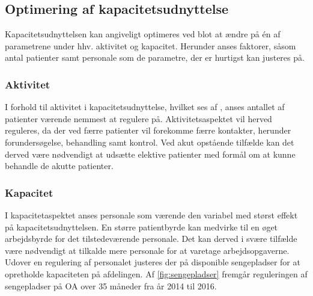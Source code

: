 \subsection{Optimering af kapacitetsudnyttelse}\label{regulerbareparametre}
Kapacitetsudnyttelsen kan angiveligt optimeres ved blot at ændre på én af parametrene under hhv. aktivitet og kapacitet. Herunder anses faktorer, såsom antal patienter samt personale som de parametre, der er hurtigst kan justeres på. 

\subsubsection{Aktivitet}
I forhold til aktivitet i kapacitetsudnyttelse, hvilket ses af , anses antallet af patienter værende nemmest at regulere på. Aktivitetsaspektet vil herved reguleres, da der ved færre patienter vil forekomme færre kontakter, herunder forundersøgelse, behandling
samt kontrol. Ved akut opstående tilfælde kan det derved være nødvendigt at udsætte elektive patienter med formål om at kunne behandle de akutte patienter. 


\subsubsection{Kapacitet}
I kapacitetaspektet anses personale som værende den variabel med størst effekt på kapacitetsudnyttelsen. En større patientbyrde kan medvirke til en øget arbejdsbyrde for det tilstedeværende personale. Det kan derved i svære tilfælde være nødvendigt at tilkalde mere personale for at varetage arbejdsopgaverne. 
Udover en regulering af personalet justeres der på disponible sengepladser for at opretholde kapaciteten på afdelingen. Af \ref{fig:sengepladser} fremgår reguleringen af sengepladser på OA over 35 måneder fra år 2014 til 2016.

